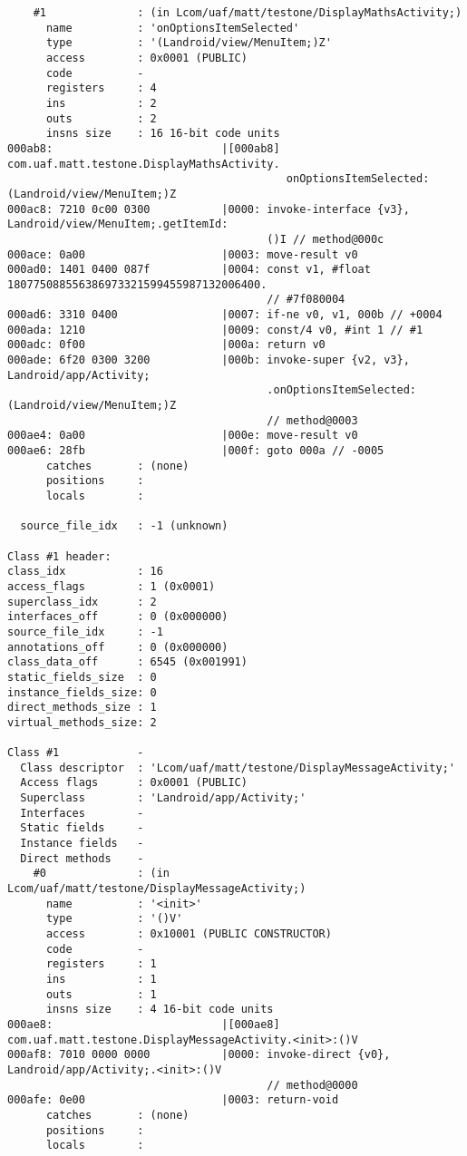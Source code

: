 \begin{lstlisting}
    #1              : (in Lcom/uaf/matt/testone/DisplayMathsActivity;)
      name          : 'onOptionsItemSelected'
      type          : '(Landroid/view/MenuItem;)Z'
      access        : 0x0001 (PUBLIC)
      code          -
      registers     : 4
      ins           : 2
      outs          : 2
      insns size    : 16 16-bit code units
000ab8:                          |[000ab8] com.uaf.matt.testone.DisplayMathsActivity.
                                           onOptionsItemSelected:(Landroid/view/MenuItem;)Z
000ac8: 7210 0c00 0300           |0000: invoke-interface {v3}, Landroid/view/MenuItem;.getItemId:
                                        ()I // method@000c
000ace: 0a00                     |0003: move-result v0
000ad0: 1401 0400 087f           |0004: const v1, #float 180775088556386973321599455987132006400.
                                        // #7f080004
000ad6: 3310 0400                |0007: if-ne v0, v1, 000b // +0004
000ada: 1210                     |0009: const/4 v0, #int 1 // #1
000adc: 0f00                     |000a: return v0
000ade: 6f20 0300 3200           |000b: invoke-super {v2, v3}, Landroid/app/Activity;
                                        .onOptionsItemSelected:(Landroid/view/MenuItem;)Z
                                        // method@0003
000ae4: 0a00                     |000e: move-result v0
000ae6: 28fb                     |000f: goto 000a // -0005
      catches       : (none)
      positions     :
      locals        :

  source_file_idx   : -1 (unknown)

Class #1 header:
class_idx           : 16
access_flags        : 1 (0x0001)
superclass_idx      : 2
interfaces_off      : 0 (0x000000)
source_file_idx     : -1
annotations_off     : 0 (0x000000)
class_data_off      : 6545 (0x001991)
static_fields_size  : 0
instance_fields_size: 0
direct_methods_size : 1
virtual_methods_size: 2

Class #1            -
  Class descriptor  : 'Lcom/uaf/matt/testone/DisplayMessageActivity;'
  Access flags      : 0x0001 (PUBLIC)
  Superclass        : 'Landroid/app/Activity;'
  Interfaces        -
  Static fields     -
  Instance fields   -
  Direct methods    -
    #0              : (in Lcom/uaf/matt/testone/DisplayMessageActivity;)
      name          : '<init>'
      type          : '()V'
      access        : 0x10001 (PUBLIC CONSTRUCTOR)
      code          -
      registers     : 1
      ins           : 1
      outs          : 1
      insns size    : 4 16-bit code units
000ae8:                          |[000ae8] com.uaf.matt.testone.DisplayMessageActivity.<init>:()V
000af8: 7010 0000 0000           |0000: invoke-direct {v0}, Landroid/app/Activity;.<init>:()V
                                        // method@0000
000afe: 0e00                     |0003: return-void
      catches       : (none)
      positions     :
      locals        :


\end{lstlisting}
